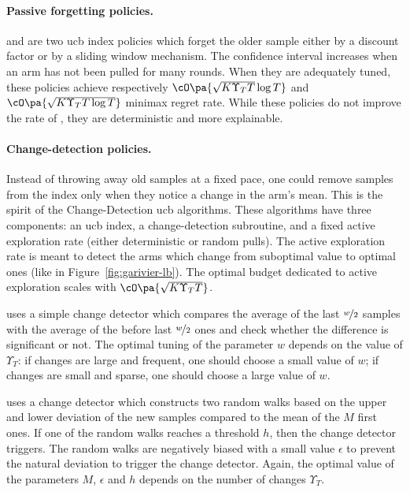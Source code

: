 \paragraph{Passive forgetting policies.} \DUCB \citep{kocsis2006discounted} and \SWUCB \citep{garivier2011upper-confidence-bound} are two ucb index policies which forget the older sample either by a discount factor or by a sliding window mechanism. The confidence interval increases when an arm has not been pulled for many rounds. When they are adequately tuned, these policies achieve respectively $\cO\pa{\sqrt{K\Upsilon_T T}\log{T}}$ and $\cO\pa{\sqrt{K\Upsilon_T T \log{T}}}$ minimax regret rate. While these policies do not improve the rate of \EXPS, they are deterministic and more explainable. 

\paragraph{Change-detection policies.} Instead of throwing away old samples at a fixed pace, one could remove samples from the index only when they notice a change in the arm's mean. This is the spirit of the Change-Detection ucb algorithms. These algorithms have three components: an ucb index, a change-detection subroutine, and a fixed active exploration rate (either deterministic or random pulls). The active exploration rate is meant to detect the arms which change from suboptimal value to optimal ones (like in Figure~\ref{fig:garivier-lb}). The optimal budget dedicated to active exploration scales with $\cO\pa{\sqrt{K\Upsilon_T T}}$. %

\MUCB \citep{cao2019nearly} uses a simple change detector which compares the average of the last $\nicefrac{w}{2}$ samples with the average of the before last $\nicefrac{w}{2}$ ones and check whether the difference is significant or not. The optimal tuning of the parameter $w$ depends on the value of $\Upsilon_T$: if changes are large and frequent, one should choose a small value of $w$; if changes are small and sparse, one should choose a large value of $w$.

\CUSUMUCB \citep{liu2018change-detection} uses a change detector which constructs two random walks based on the upper and lower deviation of the new samples compared to the mean of the $M$ first ones. If one of the random walks reaches a threshold $h$, then the change detector triggers. The random walks are negatively biased with a small value $\epsilon$ to prevent the natural deviation to trigger the change detector. Again, the optimal value of the parameters $M$, $\epsilon$ and $h$ depends on the number of changes $\Upsilon_T$.

